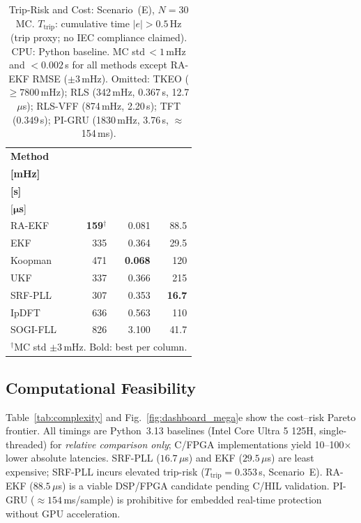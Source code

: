 \begin{table}[b!]
  \centering
  \scriptsize
  \setlength{\tabcolsep}{5pt}
  \renewcommand{\arraystretch}{1.15}
  \caption{Trip-Risk and Cost: Scenario~(E), $N\!=\!30$ MC.
    $T_{\mathrm{trip}}$: cumulative time $|e|>0.5$\,Hz (trip proxy;
    no IEC compliance claimed). CPU: Python baseline.
    MC std\,$<\!1$\,mHz and $<\!0.002$\,s for all methods except
    RA-EKF RMSE ($\pm3$\,mHz).
    Omitted: TKEO ($\geq\!7800$\,mHz);
    RLS (342\,mHz, 0.367\,s, 12.7\,$\mu$s);
    RLS-VFF (874\,mHz, 2.20\,s);
    TFT (0.349\,s);
    PI-GRU (1830\,mHz, 3.76\,s, ${\approx}$154\,ms).}
  \label{tab:risk_metrics}
  \begin{tabular}{l r r r}
    \toprule
    \textbf{Method}
      & \makecell[r]{\textbf{RMSE}\\\textbf{[mHz]}}
      & \makecell[r]{$\boldsymbol{T_{\mathrm{trip}}}$\\\textbf{[s]}}
      & \makecell[r]{\textbf{CPU}\\{[$\boldsymbol{\mu}$\textbf{s}]}} \\
    \midrule
    RA-EKF   & \textbf{159}$^{\dagger}$ & 0.081 & 88.5 \\
    EKF      & 335 & 0.364 & 29.5 \\
    Koopman  & 471 & \textbf{0.068} & 120  \\
    UKF      & 337 & 0.366 & 215  \\
    SRF-PLL  & 307 & 0.353 & \textbf{16.7} \\
    IpDFT    & 636 & 0.563 & 110  \\
    SOGI-FLL & 826 & 3.100 & 41.7 \\
    \bottomrule
    \multicolumn{4}{l}{$^{\dagger}$MC std $\pm3$\,mHz. Bold: best per column.}
  \end{tabular}
\end{table}

\subsection{Computational Feasibility}

Table~\ref{tab:complexity} and Fig.~\ref{fig:dashboard_mega}e show the
cost--risk Pareto frontier. All timings are Python~3.13 baselines
(Intel Core Ultra 5 125H, single-threaded) for \emph{relative comparison
only}; C/FPGA implementations yield 10--100$\times$ lower absolute latencies.
SRF-PLL ($16.7\,\mu$s) and EKF ($29.5\,\mu$s) are least expensive; SRF-PLL
incurs elevated trip-risk ($T_{\mathrm{trip}}\!=\!0.353$\,s, Scenario~E).
RA-EKF ($88.5\,\mu$s) is a viable DSP/FPGA candidate pending C/HIL validation.
PI-GRU (${\approx}154$\,ms/sample) is prohibitive for embedded real-time
protection without GPU acceleration.

